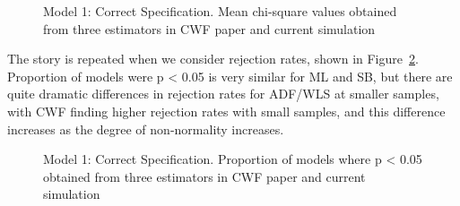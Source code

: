 \documentclass[
  letterpaper,
  DIV=11,
  numbers=noendperiod]{scrartcl}
\begin{document}
\begin{figure}[H]


\caption{\label{fig-plot_chi_1}Model 1: Correct Specification. Mean
chi-square values obtained from three estimators in CWF paper and
current simulation}

\end{figure}%

The story is repeated when we consider rejection rates, shown in
Figure~\ref{fig-plot_rejects_1}. Proportion of models were p \textless{}
0.05 is very similar for ML and SB, but there are quite dramatic
differences in rejection rates for ADF/WLS at smaller samples, with CWF
finding higher rejection rates with small samples, and this difference
increases as the degree of non-normality increases.

\begin{figure}[H]


\caption{\label{fig-plot_rejects_1}Model 1: Correct Specification.
Proportion of models where p \textless{} 0.05 obtained from three
estimators in CWF paper and current simulation}

\end{figure}%
\end{document}
